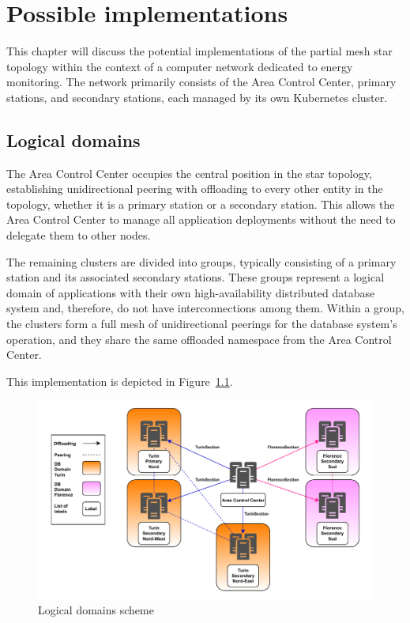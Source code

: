\chapter{Possible implementations}
This chapter will discuss the potential implementations of the partial mesh star topology within the context of a computer network dedicated to energy monitoring. The network primarily consists of the Area Control Center, primary stations, and secondary stations, each managed by its own Kubernetes cluster.

\section{Logical domains}
The Area Control Center occupies the central position in the star topology, establishing unidirectional peering with offloading to every other entity in the topology, whether it is a primary station or a secondary station. This allows the Area Control Center to manage all application deployments without the need to delegate them to other nodes.

The remaining clusters are divided into groups, typically consisting of a primary station and its associated secondary stations. These groups represent a logical domain of applications with their own high-availability distributed database system and, therefore, do not have interconnections among them. Within a group, the clusters form a full mesh of unidirectional peerings for the database system's operation, and they share the same offloaded namespace from the Area Control Center. 

This implementation is depicted in Figure~\ref{fig:domains}.

\begin{figure}[ht]\centering
\includegraphics[scale=0.7]{Pictures/Domain-v3}
\caption{Logical domains scheme}\label{fig:domains}
\end{figure}

